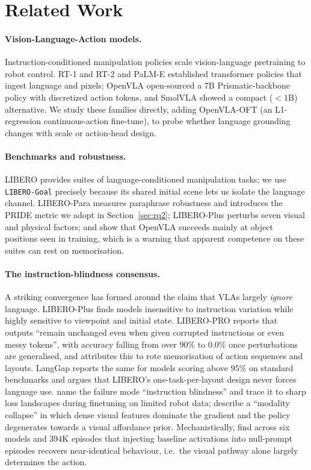 \documentclass[11pt]{article}
\begin{document}
\section{Related Work}
\paragraph{Vision-Language-Action models.} Instruction-conditioned manipulation
policies scale vision-language pretraining to robot control. RT-1 and RT-2
\citep{brohan2022rt1,brohan2023rt2} and PaLM-E \citep{driess2023palm} established
transformer policies that ingest language and pixels; OpenVLA \citep{kim2025openvla}
open-sourced a 7B Prismatic-backbone policy with discretized action tokens, and
SmolVLA \citep{shukor2025smolvla} showed a compact ($<1$B) alternative. We study
these families directly, adding OpenVLA-OFT (an L1-regression continuous-action
fine-tune), to probe whether language grounding changes with scale or action-head
design.

\paragraph{Benchmarks and robustness.} LIBERO \citep{liu2023libero} provides suites
of language-conditioned manipulation tasks; we use \texttt{LIBERO-Goal} precisely
because its shared initial scene lets us isolate the language channel.
LIBERO-Para \citep{kim2026liberopara} measures paraphrase robustness and introduces
the PRIDE metric we adopt in Section~\ref{sec:rq2}; LIBERO-Plus
\citep{fei2025liberoplus} perturbs seven visual and physical factors; and
\citet{pang2025openvla} show that OpenVLA succeeds mainly at object positions seen
in training, which is a warning that apparent competence on these suites can rest
on memorisation.

\paragraph{The instruction-blindness consensus.} A striking convergence has formed
around the claim that VLAs largely \emph{ignore} language. LIBERO-Plus finds models
insensitive to instruction variation while highly sensitive to viewpoint and initial
state. LIBERO-PRO \citep{zhou2025liberopro} reports that outputs ``remain unchanged
even when given corrupted instructions or even messy tokens'', with accuracy falling
from over $90\%$ to $0.0\%$ once perturbations are generalised, and attributes this
to rote memorisation of action sequences and layouts. LangGap
\citep{hou2026langgap} reports the same for models scoring above $95\%$ on standard
benchmarks and argues that LIBERO's one-task-per-layout design never forces language
use. \citet{zhang2026flatness} name the failure mode ``instruction blindness'' and
trace it to sharp loss landscapes during finetuning on limited robot data;
\citet{zhan2026stable} describe a ``modality collapse'' in which dense visual
features dominate the gradient and the policy degenerates towards a visual
affordance prior. Mechanistically, \citet{grant2026features} find across six models
and $394$K episodes that injecting baseline activations into null-prompt episodes
recovers near-identical behaviour, i.e.\ the visual pathway alone largely determines
the action.
\end{document}
